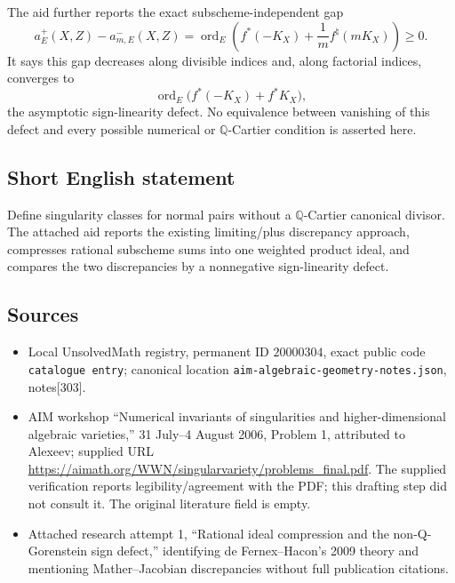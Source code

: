 \documentclass[11pt]{article}
\newcommand{\Q}{\mathbb{Q}}
\begin{document}
The aid further reports the exact subscheme-independent gap
\[
a^+_E(X,Z)-a^-_{m,E}(X,Z)
=\operatorname{ord}_E\!\left(f^*(-K_X)+\frac1m f^{\natural}(mK_X)\right)\geq0.
\]
It says this gap decreases along divisible indices and, along factorial indices, converges to
\[
\operatorname{ord}_E\bigl(f^*(-K_X)+f^*K_X\bigr),
\]
the asymptotic sign-linearity defect. No equivalence between vanishing of this defect and every possible numerical or \(\Q\)-Cartier condition is asserted here.
\subsection{Short English statement}
Define singularity classes for normal pairs without a \(\Q\)-Cartier canonical divisor. The attached aid reports the existing limiting/plus discrepancy approach, compresses rational subscheme sums into one weighted product ideal, and compares the two discrepancies by a nonnegative sign-linearity defect.
\subsection{Sources}
\begin{itemize}
\item Local UnsolvedMath registry, permanent ID \(20000304\), exact public code \texttt{catalogue entry}; canonical location \texttt{aim-algebraic-geometry-notes.json}, notes[303].
\item AIM workshop ``Numerical invariants of singularities and higher-dimensional algebraic varieties,'' 31 July--4 August 2006, Problem 1, attributed to Alexeev; supplied URL \url{https://aimath.org/WWN/singularvariety/problems_final.pdf}. The supplied verification reports legibility/agreement with the PDF; this drafting step did not consult it. The original literature field is empty.
\item Attached research attempt 1, ``Rational ideal compression and the non-Q-Gorenstein sign defect,'' identifying de Fernex--Hacon's 2009 theory and mentioning Mather--Jacobian discrepancies without full publication citations.
\end{itemize}
\end{document}
